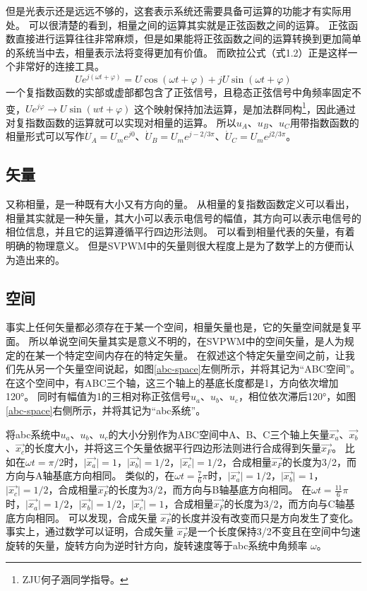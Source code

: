 \documentclass{ctexart}
\numberwithin{equation}{section}
\begin{document}
但是光表示还是远远不够的，这套表示系统还需要具备可运算的功能才有实际用处。
可以很清楚的看到，相量之间的运算其实就是正弦函数之间的运算。
正弦函数直接进行运算往往非常麻烦，但是如果能将正弦函数之间的运算转换到更加简单的系统当中去，相量表示法将变得更加有价值。
而欧拉公式（式1.2）正是这样一个非常好的连接工具。
\begin{equation}
  Ue^{j(\omega t + \varphi)} = U\cos (\omega t + \varphi) +jU\sin (\omega t + \varphi)
\end{equation}
一个复指数函数的实部或虚部都包含了正弦信号，且稳态正弦信号中角频率固定不变，$Ue^{j\varphi} \to U\sin(wt+\varphi)$ 这个映射保持加法运算，是加法群同构\footnote{ZJU何子涵同学指导。
}，因此通过对复指数函数的运算就可以实现对相量的运算。
所以$ u_A $、$ u_B $、$ u_C $用带指数函数的相量形式可以写作$ \dot U_A = U_m e^{j0} $、$ \dot U_B = U_m e^{j-2/3\pi} $、$ \dot U_C = U_m e^{j2/3\pi} $。

\subsection{矢量}
又称相量，是一种既有大小又有方向的量。
从相量的复指数函数定义可以看出，相量其实就是一种矢量，其大小可以表示电信号的幅值，其方向可以表示电信号的相位信息，并且它的运算遵循平行四边形法则。
可以看到相量代表的矢量，有着明确的物理意义。
但是SVPWM中的矢量则很大程度上是为了数学上的方便而认为造出来的。

\subsection{空间}
事实上任何矢量都必须存在于某一个空间，相量矢量也是，它的矢量空间就是复平面。
所以单说空间矢量其实是意义不明的，在SVPWM中的空间矢量，是人为规定的在某一个特定空间内存在的特定矢量。
在叙述这个特定矢量空间之前，让我们先从另一个矢量空间说起，如图\ref{abc-space}左侧所示，并将其记为“ABC空间”。
在这个空间中，有ABC三个轴，这三个轴上的基底长度都是1，方向依次增加\ang{120}。
同时有幅值为1的三相对称正弦信号$u_a$、$u_b$、$u_c$，相位依次滞后\ang{120}，如图\ref{abc-space}右侧所示，并将其记为“abc系统”。

将abc系统中$u_a$、$u_b$、$u_c$的大小分别作为ABC空间中A、B、C三个轴上矢量$\vec{x_{a}}$、$\vec{x_{b}}$、$\vec{x_{c}}$的长度大小，并将这三个矢量依据平行四边形法则进行合成得到矢量$\vec{x_F}$。
比如在$ \omega t = \pi /2 $时，$ \vert \vec{x_a} \vert = 1 $，$ \vert \vec{x_b} \vert = 1/2 $，$ \vert \vec{x_c} \vert = 1/2 $，合成相量$  \vec{x_F} $的长度为3/2，而方向与A轴基底方向相同。
类似的，在$ \omega t = \frac{7}{6}\pi $时，$ \vert \vec{x_a} \vert = 1/2 $，$ \vert \vec{x_b} \vert = 1 $，$ \vert \vec{x_c} \vert = 1/2 $，合成相量$  \vec{x_F} $的长度为3/2，而方向与B轴基底方向相同。
在$ \omega t = \frac{11}{6}\pi $时，$ \vert \vec{x_a} \vert = 1/2 $，$ \vert \vec{x_b} \vert = 1/2 $，$ \vert \vec{x_c} \vert = 1 $，合成相量$  \vec{x_F} $的长度为3/2，而方向与C轴基底方向相同。
可以发现，合成矢量 $ \vec{x_F} $的长度并没有改变而只是方向发生了变化。
事实上，通过数学可以证明，合成矢量 $ \vec{x_F} $是一个长度保持3/2不变且在空间中匀速旋转的矢量，旋转方向为逆时针方向，旋转速度等于abc系统中角频率 $ \omega $。
\end{document}
